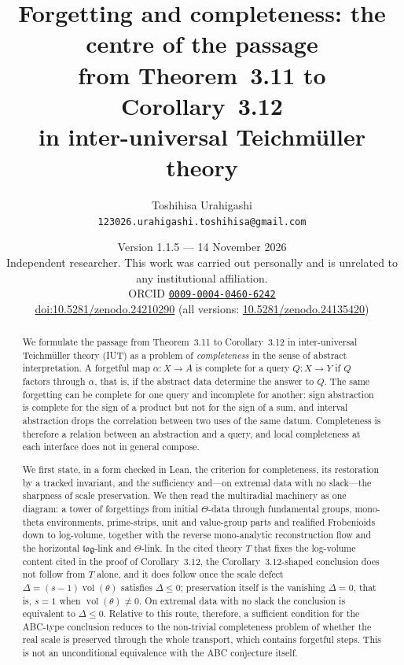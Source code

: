 \documentclass[11pt]{article}
\title{Forgetting and completeness: the centre of the passage\\
from Theorem~3.11 to Corollary~3.12\\
in inter-universal Teichm\"uller theory}
\author{Toshihisa Urahigashi\\
\small\texttt{123026.urahigashi.toshihisa@gmail.com}}
\date{Version 1.1.5 --- 14 November 2026\\[3pt]
\small Independent researcher. This work was carried out personally and is
unrelated to any institutional affiliation.\\[3pt]
\small ORCID \href{https://orcid.org/0009-0004-0460-6242}{\texttt{0009-0004-0460-6242}}\\[-2pt]
\small \href{https://doi.org/10.5281/zenodo.24210290}{doi:10.5281/zenodo.24210290} (all versions: \href{https://doi.org/10.5281/zenodo.24135420}{10.5281/zenodo.24135420})}
\theoremstyle{plain}
\theoremstyle{definition}
\theoremstyle{remark}
\newcommand{\vol}{\operatorname{vol}}
\begin{document}
\maketitle

\begin{abstract}
We formulate the passage from Theorem~3.11 to Corollary~3.12 in
inter-universal Teichm\"uller theory (IUT) as a problem of
\emph{completeness} in the sense of abstract interpretation.  A
forgetful map $\alpha:X\to A$ is complete for a query $Q:X\to Y$ if
$Q$ factors through $\alpha$, that is, if the abstract data determine
the answer to $Q$.  The same forgetting can be complete for one query
and incomplete for another: sign abstraction is complete for the sign
of a product but not for the sign of a sum, and interval abstraction
drops the correlation between two uses of the same datum.
Completeness is therefore a relation between an abstraction and a
query, and local completeness at each interface does not in general
compose.

We first state, in a form checked in Lean, the criterion for
completeness, its restoration by a tracked invariant, and the
sufficiency and---on extremal data with no slack---the sharpness of
scale preservation.  We then read the multiradial machinery as one
diagram: a tower of forgettings from initial $\Theta$-data through
fundamental groups, mono-theta environments, prime-strips, unit and
value-group parts and realified Frobenioids down to log-volume,
together with the reverse mono-analytic reconstruction flow and the
horizontal $\mathfrak{log}$-link and $\Theta$-link.  In the cited
theory $T$ that fixes the log-volume content cited in the proof of
Corollary~3.12, the Corollary~3.12-shaped conclusion does not follow
from $T$ alone, and it does follow once the scale defect
$\Delta=(s-1)\vol(\theta)$ satisfies $\Delta\le 0$; preservation
itself is the vanishing $\Delta=0$, that is, $s=1$ when
$\vol(\theta)\ne0$.  On extremal data with no slack the conclusion is
equivalent to $\Delta\le0$.  Relative to this route, therefore, a
sufficient condition for the ABC-type conclusion reduces to the
non-trivial completeness problem of whether the real scale is
preserved through the whole transport, which contains forgetful
steps.  This is not an unconditional equivalence with the ABC
conjecture itself.


\end{abstract}
\end{document}
